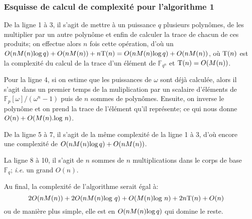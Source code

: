 \documentclass[a4paper]{article} %
\numberwithin{equation}{section}
\newcommand\GF[1]{\mathbb{F}_{#1}}
\begin{document}
\subsubsection*{Esquisse de calcul de complexité pour l'algorithme 1}
De la ligne 1 à 3, il s'agit de mettre à un puissance $q$ plusieurs polynômes, de les multiplier par un autre polynôme et enfin de calculer la trace de chacun de ces produits; on effectue alors $n$ fois cette opération, d'où un $O(nM(n)\textup{log}\,q) + O(nM(n)) + n\textup{T}(n) = O(nM(n)\textup{log}\,q) + O(nM(n))$, où $\textup{T}(n)$ est la complexité du calcul de la trace d'un élément de $\GF{q^n}$ et $\textup{T}(n) = O(M(n))$.\par
Pour la ligne 4, si on estime que les puissances de $\omega$ sont déjà calculée, alors il s'agit dans un premier temps de la muliplication par un scalaire d'éléments de $\mathbb{F}_p[\omega]/(\omega^n - 1)$ puis de $n$ sommes de polynômes. Ensuite, on inverse le polynôme et on prend la trace de l'élément qu'il représente; ce qui nous donne $O(n) + O(M(n).\textup{log }n)$.\par 
De la ligne 5 à 7, il s'agit de la même complexité de la ligne 1 à 3, d'où encore une complexité de $O(nM(n)\textup{log}\,q) + O(nM(n))$.\par
La ligne 8 à 10, il s'agit de $n$ sommes de $n$ multiplications dans le corps de base $\GF{q}$; \textit{i.e.} un grand $O(n)$.\par
Au final, la complexité de l'algorithme serait égal à:
 \[2O(nM(n)) + 2O(nM(n)\textup{log }q) +  O(M(n)\textup{log }n) + 2n\textup{T}(n) + O(n)\] 
ou de manière plus simple, elle est en $O(nM(n)\textup{log}\,q)$ qui domine le reste.
\end{document}
